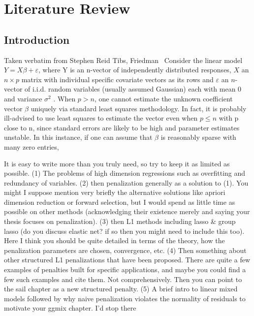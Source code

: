 \chapter{Literature Review\label{ch:litreview}}

\section{Introduction}
Taken verbatim from Stephen Reid Tibs, Friedman~\cite{reid2016study}
Consider the linear model
$Y = X\beta + \varepsilon$,
where Y is an n-vector of independently distributed responses, $X$ an $n \times p$ matrix
with individual specific covariate vectors as its rows and $\varepsilon$ an $n$-vector of
i.i.d. random variables (usually assumed Gaussian) each with mean 0 and variance $\sigma^2$
.
When $p > n$, one cannot estimate the unknown coefficient vector $\beta$ uniquely
via standard least squares methodology. In fact, it is probably ill-advised to use
least squares to estimate the vector even when $p \leq n$ with p close to n, since
standard errors are likely to be high and parameter estimates unstable. In this
instance, if one can assume that $\beta$ is reasonably sparse with many zero entries,


It is easy to write more than you truly need, so try to keep it as limited as possible.  
(1) The problems of high dimension regressions such as overfitting and redundancy of variables.  
(2) then  penalization generally as a solution to (1).  
You might I suppose mention very briefly the alternative solutions like apriori dimension reduction or forward selection, but I would spend as little time as possible on other methods (acknowledging their existence merely and saying your thesis focuses on penalization).  
(3) then L1 methods including lasso \& group lasso (do you discuss elastic net? if so then you might need to include this too). Here I think you should be quite detailed in terms of the theory, how the penalization parameters are chosen, convergence, etc. 
(4) Then something about other structured L1 penalizations that have been proposed.  There are quite a few examples of penalties built for specific applications, and maybe you could find a few such examples and cite them. Not comprehensively.  Then you can point to the sail chapter as a new structured penalty.  
(5) A brief intro to linear mixed models followed by why naive penalization violates the normality of residuals to motivate your ggmix chapter.    I'd stop there


